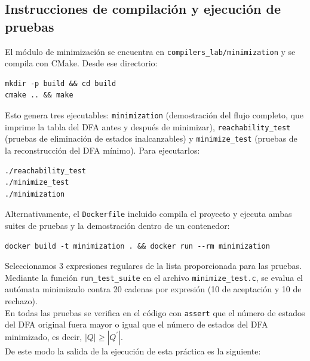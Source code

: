 \documentclass[12pt, letterpaper]{article}
\begin{document}
\subsection*{Instrucciones de compilación y ejecución de pruebas}
\noindent El módulo de minimización se encuentra en \texttt{compilers\_lab/minimization} y se compila con CMake. Desde ese directorio:
\begin{lstlisting}[style=bashstyle]
mkdir -p build && cd build
cmake .. && make
\end{lstlisting}
Esto genera tres ejecutables: \texttt{minimization} (demostración del flujo completo, que imprime la tabla del DFA antes y después de minimizar), \texttt{reachability\_test} (pruebas de eliminación de estados inalcanzables) y \texttt{minimize\_test} (pruebas de la reconstrucción del DFA mínimo). Para ejecutarlos:
\begin{lstlisting}[style=bashstyle]
./reachability_test
./minimize_test
./minimization
\end{lstlisting}
Alternativamente, el \texttt{Dockerfile} incluido compila el proyecto y ejecuta ambas suites de pruebas y la demostración dentro de un contenedor:
\begin{lstlisting}[style=bashstyle]
docker build -t minimization . && docker run --rm minimization
\end{lstlisting}
Seleccionamos 3 expresiones regulares de la lista proporcionada para las pruebas. Mediante la función \texttt{run\_test\_suite} en el archivo \texttt{minimize\_test.c}, se evalua el autómata minimizado contra 20 cadenas por expresión (10 de aceptación y 10 de rechazo).\\
En todas las pruebas se verifica en el código con \texttt{assert} que el número de estados del DFA original fuera mayor o igual que el número de estados del DFA minimizado, es decir, $|Q| \geq |Q^{\prime}|$.\\
De este modo la salida de la ejecución de esta práctica es la siguiente:\\
\end{document}
